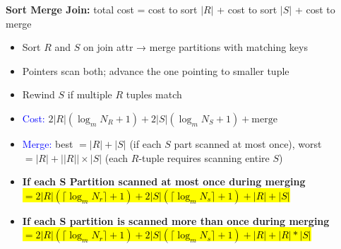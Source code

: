 \documentclass[10pt,landscape]{article}
\newcommand{\1}{\mathmybb{1}}
\begin{document}
\begin{multicols*}{3}
\textbf{Sort Merge Join:} total cost = cost to sort $|R|$ + cost to sort $|S|$ + cost to merge 
\begin{itemize}
    \item Sort $R$ and $S$ on join attr → merge partitions with matching keys
    \item Pointers scan both; advance the one pointing to smaller tuple
    \item Rewind $S$ if multiple $R$ tuples match
    \item \textcolor{blue}{Cost:} $2|R|(\log_m N_R + 1) + 2|S|(\log_m N_S + 1) + \text{merge}$
    \item \textcolor{blue}{Merge:} best $= |R| + |S|$ (if each $S$ part scanned at most once), worst $= |R| + ||R|| \times |S|$ (each $R$-tuple requires scanning entire $S$)
    \item \textbf{If each S Partition scanned at most once during merging} \hl{$= 2|R|(\lceil \log_m N_r \rceil + 1) + 2|S|(\lceil \log_m N_s \rceil + 1) + |R| + |S|$}
    \item \textbf{If each S partition is scanned more than once during merging} \hl{$= 2|R|(\lceil \log_m N_r \rceil + 1) + 2|S|(\lceil \log_m N_s \rceil + 1) + |R| + |R| \ast |S|$}
\end{itemize}

\end{multicols*}
\end{document}
